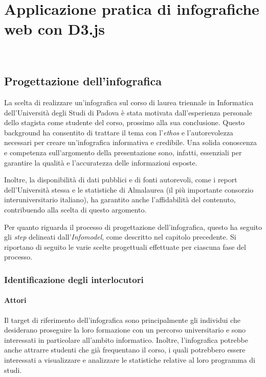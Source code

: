 \chapter{Applicazione pratica di infografiche web con D3.js}
\label{cap:applicazione}
\\

\section{Progettazione dell'infografica}
La scelta di realizzare un'infografica sul corso di laurea triennale in Informatica dell'Università degli Studi di Padova è stata motivata dall'esperienza personale dello stagista come 
studente del corso, prossimo alla sua conclusione. 
Questo background ha consentito di trattare il tema con l'\emph{ethos} e l'autorevolezza necessari per creare un'infografica informativa e credibile.
Una solida conoscenza e competenza sull'argomento della presentazione sono, infatti, essenziali per garantire la qualità e l'accuratezza delle informazioni esposte.  

Inoltre, la disponibilità di dati pubblici e di fonti autorevoli, come i report dell'Università stessa e le statistiche di Almalaurea (il più importante consorzio interuniversitario italiano), ha 
garantito anche l'affidabilità del contenuto, contribuendo alla scelta di questo argomento.

\bigskip
\noindent Per quanto riguarda il processo di progettazione dell'infografica, questo ha seguito gli \emph{step} delineati dall'\emph{Infomodel}, come descritto nel capitolo precedente. 
Si riportano di seguito le varie scelte progettuali effettuate per ciascuna fase del processo.

\subsection{Identificazione degli interlocutori}
\subsubsection{Attori}
Il target di riferimento dell'infografica sono principalmente gli individui che desiderano proseguire la loro formazione con un percorso universitario e sono interessati
in particolare all'ambito informatico. 
Inoltre, l'infografica potrebbe anche attrarre studenti che già frequentano il corso, i quali potrebbero essere interessati a visualizzare e analizzare le statistiche relative al loro programma di studi. 

